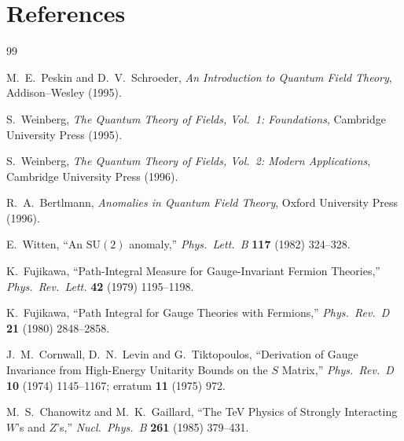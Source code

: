\documentclass[11pt]{article}
\theoremstyle{remark}
\newcommand{\SU}{\ensuremath{\mathrm{SU}}}
\begin{document}
\section*{References}
\begin{thebibliography}{99}

M.~E.~Peskin and D.~V.~Schroeder,
\emph{An Introduction to Quantum Field Theory},
Addison--Wesley (1995).

S.~Weinberg,
\emph{The Quantum Theory of Fields, Vol.\ 1: Foundations},
Cambridge University Press (1995).

S.~Weinberg,
\emph{The Quantum Theory of Fields, Vol.\ 2: Modern Applications},
Cambridge University Press (1996).

R.~A.~Bertlmann,
\emph{Anomalies in Quantum Field Theory},
Oxford University Press (1996).

E.~Witten,
``An $\SU(2)$ anomaly,''
\emph{Phys.\ Lett.\ B} \textbf{117} (1982) 324--328.

K.~Fujikawa,
``Path-Integral Measure for Gauge-Invariant Fermion Theories,''
\emph{Phys.\ Rev.\ Lett.} \textbf{42} (1979) 1195--1198.

K.~Fujikawa,
``Path Integral for Gauge Theories with Fermions,''
\emph{Phys.\ Rev.\ D} \textbf{21} (1980) 2848--2858.

J.~M.~Cornwall, D.~N.~Levin and G.~Tiktopoulos,
``Derivation of Gauge Invariance from High-Energy Unitarity Bounds on the $S$ Matrix,''
\emph{Phys.\ Rev.\ D} \textbf{10} (1974) 1145--1167;
erratum \textbf{11} (1975) 972.

M.~S.~Chanowitz and M.~K.~Gaillard,
``The TeV Physics of Strongly Interacting $W$'s and $Z$'s,''
\emph{Nucl.\ Phys.\ B} \textbf{261} (1985) 379--431.

\end{thebibliography}
\end{document}
